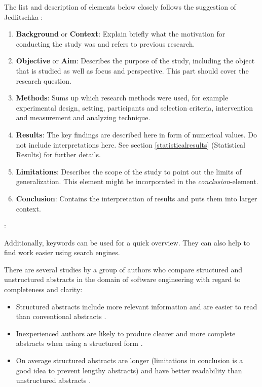 The list and description of elements below closely follows the suggestion of Jedlitschka \etal \cite{Jedlitschka2008}:
\begin{enumerate}
	\item \textbf{Background} or \textbf{Context}: Explain briefly what the motivation for conducting the study was and refers to previous research.
	\item \textbf{Objective} or \textbf{Aim}: Describes the purpose of the study, including the object that is studied as well as focus and perspective. This part should cover the research question.
	\item \textbf{Methods}: Sums up which research methods were used, for example experimental design, setting, participants and selection criteria, intervention and measurement and analyzing technique.
	\item \textbf{Results}: The key findings are described here in form of numerical values. Do not include interpretations here. See section \ref{statisticalresults} (Statistical Results) for further details.
	\item \textbf{Limitations}: Describes the scope  of the study to point out the limits of generalization. This element might be incorporated in the \emph{conclusion}-element.
	\item \textbf{Conclusion}:  Contains the interpretation of results and puts them into larger context.
\end{enumerate}

: \cite{EBSE}

Additionally, keywords can be used for a quick overview. They can also help to find work easier using search engines.

There are several studies by a group of authors who compare structured and unstructured abstracts in the domain of software engineering with regard to completeness and clarity:
\begin{itemize}
\item Structured abstracts include more relevant information and are easier to read than conventional abstracts \cite{Budgen2007,Budgen2008}.
\item Inexperienced authors are likely to produce clearer and more complete abstracts when using a structured form \cite{Budgen2011} .
\item On average structured abstracts are longer (limitations in conclusion is a good idea to prevent lengthy abstracts) and have better readability than unstructured abstracts \cite{KBO2008}.
\end{itemize}
	
